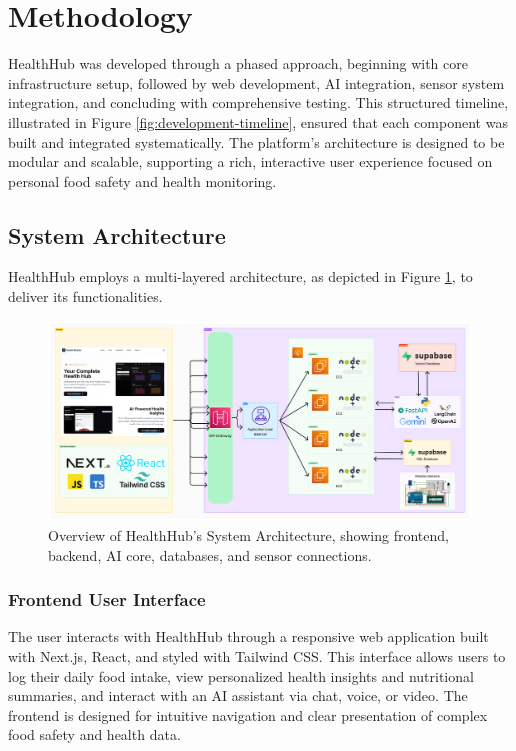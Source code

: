 \section{Methodology}

HealthHub was developed through a phased approach, beginning with core infrastructure setup, followed by web development, AI integration, sensor system integration, and concluding with comprehensive testing. This structured timeline, illustrated in Figure \ref{fig:development-timeline}, ensured that each component was built and integrated systematically. The platform's architecture is designed to be modular and scalable, supporting a rich, interactive user experience focused on personal food safety and health monitoring.

\subsection{System Architecture}
HealthHub employs a multi-layered architecture, as depicted in Figure \ref{fig:system-architecture-overview}, to deliver its functionalities. 

\begin{figure}[!t]
\centering
\includegraphics[width=\columnwidth]{figures/hm-system-architecture.png}
\caption{Overview of HealthHub's System Architecture, showing frontend, backend, AI core, databases, and sensor connections.}
\label{fig:system-architecture-overview}
\end{figure}

\subsubsection{Frontend User Interface}
The user interacts with HealthHub through a responsive web application built with Next.js, React, and styled with Tailwind CSS. This interface allows users to log their daily food intake, view personalized health insights and nutritional summaries, and interact with an AI assistant via chat, voice, or video. The frontend is designed for intuitive navigation and clear presentation of complex food safety and health data.

